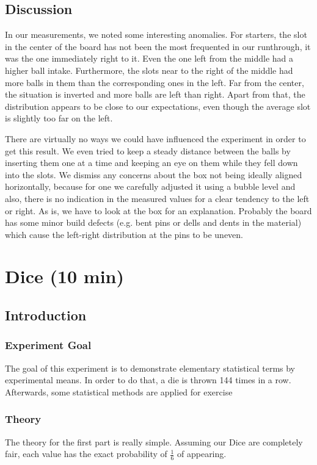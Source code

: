 \documentclass{scrreprt}
\begin{document}
\section{Discussion}
In our measurements, we noted some interesting anomalies. For starters, the slot in the center of the board has not been the most frequented in our runthrough, it was the one immediately right to it. Even the one left from the middle had a higher ball intake. Furthermore, the slots near to the right of the middle had more balls in them than the corresponding ones in the left. Far from the center, the situation is inverted and more balls are left than right. Apart from that, the distribution appears to be close to our expectations, even though the average slot is slightly too far on the left.

There are virtually no ways we could have influenced the experiment in order to get this result. We even tried to keep a steady distance between the balls by inserting them one at a time and keeping an eye on them while they fell down into the slots. We dismiss any concerns about the box not being ideally aligned horizontally, because for one we carefully adjusted it using a bubble level and also, there is no indication in the measured values for a clear tendency to the left or right. As is, we have to look at the box for an explanation. Probably the board has some minor build defects (e.g. bent pins or dells and dents in the material) which cause the left-right distribution at the pins to be uneven.


\chapter[Dice]{Dice (10 min)}

\section{Introduction}

\subsection{Experiment Goal}
The goal of this experiment is to demonstrate elementary statistical terms by experimental means. In order to do that, a die is thrown 144 times in a row. Afterwards, some statistical methods are applied for exercise

\subsection{Theory}
The theory for the first part is really simple. Assuming our Dice are completely fair, each value has the exact probability of $\frac{1}{6}$ of appearing.
 
\end{document}
